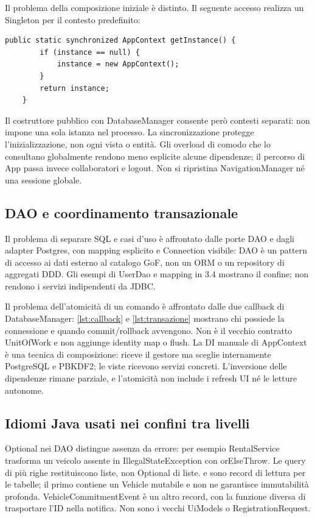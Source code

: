 Il problema della composizione iniziale è distinto. Il seguente accesso
realizza un Singleton per il contesto predefinito:

\noindent\begin{minipage}{\linewidth}
\begin{lstlisting}[firstnumber=112,caption={\code{AppContext.java}: accesso Singleton sincronizzato al contesto predefinito.},
  label=lst:singleton]
    public static synchronized AppContext getInstance() {
        if (instance == null) {
            instance = new AppContext();
        }
        return instance;
    }
\end{lstlisting}
\end{minipage}

Il costruttore pubblico con DatabaseManager consente però contesti
separati: non impone una sola istanza nel processo. La sincronizzazione
protegge l'inizializzazione, non ogni vista o entità. Gli overload di
comodo che lo consultano globalmente rendono meno esplicite alcune
dipendenze; il percorso di App passa invece collaboratori e logout.
Non si ripristina NavigationManager né una sessione globale.

\subsection{DAO e coordinamento transazionale}
Il problema di separare SQL e casi d'uso è affrontato dalle porte DAO e
dagli adapter Postgres, con mapping esplicito e Connection visibile:
DAO è un pattern di accesso ai dati esterno al catalogo GoF, non un ORM
o un repository di aggregati DDD. Gli esempi di UserDao e mapping in
3.4 mostrano il confine; non rendono i servizi indipendenti da JDBC.

Il problema dell'atomicità di un comando è affrontato dalle due callback
di DatabaseManager: \ref{lst:callback} e \ref{lst:transazione} mostrano
chi possiede la connessione e quando commit/rollback avvengono. Non è
il vecchio contratto UnitOfWork e non aggiunge identity map o flush.
La DI manuale di AppContext è una tecnica di composizione: riceve il
gestore ma sceglie internamente PostgreSQL e PBKDF2; le viste ricevono
servizi concreti. L'inversione delle dipendenze rimane parziale, e
l'atomicità non include i refresh UI né le letture autonome.

\subsection{Idiomi Java usati nei confini tra livelli}
Optional nei DAO distingue assenza da errore: per esempio RentalService
trasforma un veicolo assente in IllegalStateException con orElseThrow.
Le query di più righe restituiscono liste, non Optional di liste.
 e  sono record
di lettura per le tabelle; il primo contiene un Vehicle mutabile e non
ne garantisce immutabilità profonda. VehicleCommitmentEvent è un altro
record, con la funzione diversa di trasportare l'ID nella notifica.
Non sono i vecchi UiModels o RegistrationRequest.


